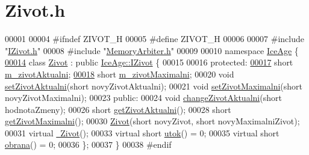 \hypertarget{Zivot_8h_source}{}\section{Zivot.\+h}
\label{Zivot_8h_source}

\begin{DoxyCode}
00001 
00004 \textcolor{preprocessor}{#ifndef ZIVOT\_H}
00005 \textcolor{preprocessor}{#define ZIVOT\_H}
00006 
00007 \textcolor{preprocessor}{#include "\hyperlink{IZivot_8h}{IZivot.h}"}
00008 \textcolor{preprocessor}{#include "\hyperlink{MemoryArbiter_8h}{MemoryArbiter.h}"}
00009 
00010 \textcolor{keyword}{namespace }\hyperlink{namespaceIceAge}{IceAge} \{
\hypertarget{Zivot_8h_source.tex_l00014}{}\hyperlink{classIceAge_1_1Zivot}{00014}     \textcolor{keyword}{class }\hyperlink{classIceAge_1_1Zivot}{Zivot} : \textcolor{keyword}{public} \hyperlink{classIceAge_1_1IZivot}{IceAge::IZivot} \{
00015 
00016     \textcolor{keyword}{protected}:
\hypertarget{Zivot_8h_source.tex_l00017}{}\hyperlink{classIceAge_1_1Zivot_a50f8dfc33d5affeb16709ee8e5b1e445}{00017}         \textcolor{keywordtype}{short} \hyperlink{classIceAge_1_1Zivot_a50f8dfc33d5affeb16709ee8e5b1e445}{m\_zivotAktualni};  
\hypertarget{Zivot_8h_source.tex_l00018}{}\hyperlink{classIceAge_1_1Zivot_a256134d066a2b08095fc5a5fe50ac557}{00018}         \textcolor{keywordtype}{short} \hyperlink{classIceAge_1_1Zivot_a256134d066a2b08095fc5a5fe50ac557}{m\_zivotMaximalni}; 
00020         \textcolor{keywordtype}{void} \hyperlink{classIceAge_1_1Zivot_ac09b749a9007fb4a02ea9d7f5000627c}{setZivotAktualni}(\textcolor{keywordtype}{short} novyZivotAktualni); 
00021         \textcolor{keywordtype}{void} \hyperlink{classIceAge_1_1Zivot_a39f5216f0b6a6dcae8a41543ca41c3bb}{setZivotMaximalni}(\textcolor{keywordtype}{short} novyZivotMaximalni); 
00023     \textcolor{keyword}{public}:
00024         \textcolor{keywordtype}{void} \hyperlink{classIceAge_1_1Zivot_a980dc5a5af6d14c23ecca025e3ec7485}{changeZivotAktualni}(\textcolor{keywordtype}{short} hodnotaZmeny); 
00026         \textcolor{keywordtype}{short} \hyperlink{classIceAge_1_1Zivot_ae4e3a167722a80ccace3985f183ddd8d}{getZivotAktualni}(); 
00028         \textcolor{keywordtype}{short} \hyperlink{classIceAge_1_1Zivot_a75a65879dd6ddc0bc3e402ac6f613813}{getZivotMaximalni}(); 
00030         \hyperlink{classIceAge_1_1Zivot_a97d6d435c5f046fdf0cf295fad6db7c6}{Zivot}(\textcolor{keywordtype}{short} novyZivot, \textcolor{keywordtype}{short} novyMaximalniZivot); 
00031         \textcolor{keyword}{virtual} \hyperlink{classIceAge_1_1Zivot_a998f76a4813dfecc610acbabdb037bae}{~Zivot}(); 
00033         \textcolor{keyword}{virtual} \textcolor{keywordtype}{short} \hyperlink{classIceAge_1_1Zivot_a8cb36d6191c9e77a97d90833b6f0824d}{utok}() = 0; 
00035         \textcolor{keyword}{virtual} \textcolor{keywordtype}{short} \hyperlink{classIceAge_1_1Zivot_a7d712f401ea189ed382f5cf05869a37a}{obrana}() = 0; 
00036     \};
00037 \}
00038 \textcolor{preprocessor}{#endif}
\end{DoxyCode}
